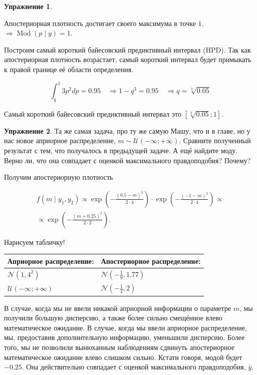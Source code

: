\documentclass[12pt, a4paper, oneside]{extreport}
\DeclareMathOperator{\Mod}{Mod}
\def \mN{\mathcal{N}}
\def \mU{\mathcal{U}}
\newcommand{\expp}[1]{ \exp \left( #1 \right)}
\theoremstyle{plain}              %
\theoremstyle{definition}         %
\newtheorem{problem}{\color{myblue} Упражнение}
\begin{document}
\begin{problem}
\begin{sol}
Апостериорная плотность достигает своего максимума в точке $1$. $\Rightarrow \Mod(p \mid y) = 1$.
			
			
Построим самый короткий байесовский предиктивный интервал (HPD). Так как апостериорная плотность возрастает, самый короткий интервал будет примыкать к правой границе её области определения.
			
\[ \int_q^1 3p^2 dp = 0.95 \quad \Rightarrow 1 - q^3 = 0.95 \quad \Rightarrow q = \sqrt[3]{0.05} \]

Самый короткий байесовский предиктивный интервал это $[\sqrt[3]{0.05};1]$.

\end{sol}
\end{problem}


\begin{problem}\label{upr_norm}
	Та же самая задача, про ту же самую Машу, что и в главе, но у нас новое априорное распределение, $m \sim \mU(-\infty; +\infty)$. Сравните полученный результат с тем, что получалось в предыдущей задаче. А ещё найдите моду. Верно ли, что она совпадает с оценкой максимального правдоподобия? Почему? 
	\begin{sol}
		
		Получим апостериорную плотность
		
		\begin{multline*}
		 f(m \mid y_1, y_2) \propto \expp{-\frac{(0.5 - m)^2}{2 \cdot 4}} \cdot \expp{-\frac{(-1 - m)^2}{2 \cdot 4}} \propto \\ \propto \expp{-\frac{(m+0.25)^2}{2 \cdot 2}}.
		 \end{multline*}
		
		Нарисуем табличку! 
		
		\begin{table}[H]
		\begin{tabularx}{\textwidth}{XX}
			\toprule
			Априорное распределение: & Апостериорное распределение: \\
			\midrule
			$\mN(1,4^2)$             &  $\mN(-\frac{1}{9},1.77)$ \\
			$\mU(-\infty;+\infty)$   &  $\mN(-\frac{1}{4},2)$ \\
			\bottomrule
		\end{tabularx}
		\end{table}
		
		В случае, когда мы не ввели никакой априорной информации о параметре $m$, мы получили большую дисперсию, а также более сильно смещённое влево математическое ожидание. В случае, когда мы ввели априорное распределение, мы, предоставив дополнительную информацию, уменьшили дисперсию. Более того, мы не позволили вынюханным наблюдениям сдвинуть апостериорное математическое ожидание влево слишком сильно. Кстати говоря, модой будет $-0.25$.  Она действительно совпадает с  оценкой максимального правдоподобия, $\bar y$.
	\end{sol}
\end{problem}
\end{document}
